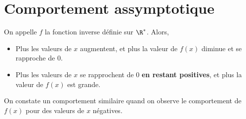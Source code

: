 \documentclass{article}
\begin{document}
\newpage

\section{Comportement assymptotique}

\begin{tcolorbox}
\begin{remark}
On appelle $f$ la fonction inverse définie sur $\R^*$. Alors,
\begin{itemize}
\item Plus les valeurs de $x$ augmentent, et plus la valeur de $f(x)$ diminue et se rapproche de $0$.
\item Plus les valeurs de $x$ se rapprochent de $0$ \textbf{en restant positives}, et plus la valeur de $f(x)$ est grande. 
\end{itemize}
On constate un comportement similaire quand on observe le comportement de $f(x)$ pour des valeurs de $x$ négatives.       
\end{remark}
\end{tcolorbox}
\end{document}
